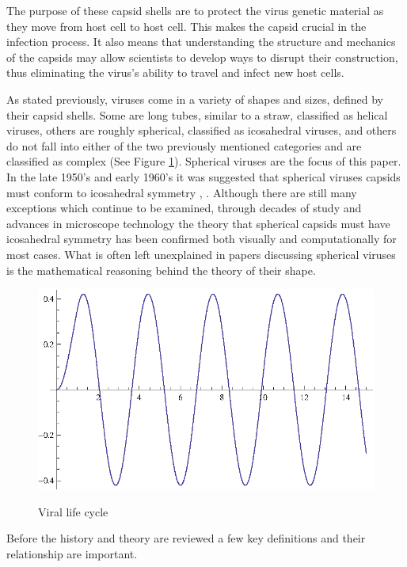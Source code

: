 \documentclass[12pt,letter]{article}
\begin{document}
The purpose of these capsid shells are to protect the virus genetic material as they move from host cell to host cell. This makes the capsid crucial in the infection process. It also means that understanding the structure and mechanics of the capsids may allow scientists to develop ways to disrupt their construction, thus eliminating the virus's ability to travel and infect new host cells. 

As stated previously, viruses come in a variety of shapes and sizes, defined by their capsid shells. Some are long tubes, similar to a straw, classified as helical viruses, others are roughly spherical, classified as icosahedral viruses, and others do not fall into either of the two previously mentioned categories and are classified as complex (See Figure \ref{fig:virus_types}). Spherical viruses are the focus of this paper. In the late 1950's and early 1960's it was suggested that spherical viruses capsids must conform to icosahedral symmetry \cite{Crick:1956}, \cite{Caspar:1962}. Although there are still many exceptions which continue to be examined, through decades of study and advances in microscope technology the theory that spherical capsids must have icosahedral symmetry has been confirmed both visually and computationally for most cases. What is often left unexplained in papers discussing spherical viruses is the mathematical reasoning behind the theory of their shape.

\begin{figure}[h]
	\caption{Viral life cycle}
	\centering
	\includegraphics{place_holder.eps}
	\label{fig:virus_types}
\end{figure}

Before the history and theory are reviewed a few key definitions and their relationship are important.
\end{document}

